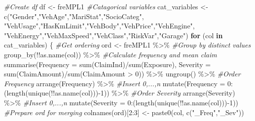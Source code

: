 \documentclass[
]{article}
\newenvironment{Shaded}{\begin{snugshade}}{\end{snugshade}}
\newcommand{\AttributeTok}[1]{\textcolor[rgb]{0.77,0.63,0.00}{#1}}
\newcommand{\CommentTok}[1]{\textcolor[rgb]{0.56,0.35,0.01}{\textit{#1}}}
\newcommand{\ControlFlowTok}[1]{\textcolor[rgb]{0.13,0.29,0.53}{\textbf{#1}}}
\newcommand{\DecValTok}[1]{\textcolor[rgb]{0.00,0.00,0.81}{#1}}
\newcommand{\FunctionTok}[1]{\textcolor[rgb]{0.00,0.00,0.00}{#1}}
\newcommand{\NormalTok}[1]{#1}
\newcommand{\OtherTok}[1]{\textcolor[rgb]{0.56,0.35,0.01}{#1}}
\newcommand{\SpecialCharTok}[1]{\textcolor[rgb]{0.00,0.00,0.00}{#1}}
\newcommand{\StringTok}[1]{\textcolor[rgb]{0.31,0.60,0.02}{#1}}
\begin{document}
\begin{Shaded}
\begin{Highlighting}[]
\CommentTok{\#Create df}
\NormalTok{df }\OtherTok{\textless{}{-}}\NormalTok{ freMPL1}
\CommentTok{\#Catagorical variables}
\NormalTok{cat\_variables }\OtherTok{\textless{}{-}} \FunctionTok{c}\NormalTok{(}\StringTok{"Gender"}\NormalTok{,}\StringTok{"VehAge"}\NormalTok{,}\StringTok{"MariStat"}\NormalTok{,}\StringTok{"SocioCateg"}\NormalTok{,}
                   \StringTok{"VehUsage"}\NormalTok{,}\StringTok{"HasKmLimit"}\NormalTok{,}\StringTok{"VehBody"}\NormalTok{,}\StringTok{"VehPrice"}\NormalTok{,}\StringTok{"VehEngine"}\NormalTok{,}
                   \StringTok{"VehEnergy"}\NormalTok{,}\StringTok{"VehMaxSpeed"}\NormalTok{,}\StringTok{"VehClass"}\NormalTok{,}\StringTok{"RiskVar"}\NormalTok{,}\StringTok{"Garage"}\NormalTok{)}
\ControlFlowTok{for}\NormalTok{ (col }\ControlFlowTok{in}\NormalTok{ cat\_variables) \{}
  \CommentTok{\#Get ordering}
\NormalTok{  ord }\OtherTok{\textless{}{-}}\NormalTok{ freMPL1 }\SpecialCharTok{\%\textgreater{}\%} 
    \CommentTok{\#Group by distinct values}
    \FunctionTok{group\_by}\NormalTok{(}\SpecialCharTok{!!}\FunctionTok{as.name}\NormalTok{(col)) }\SpecialCharTok{\%\textgreater{}\%}
    \CommentTok{\#Calculate frequency and mean claim}
    \FunctionTok{summarise}\NormalTok{(}\AttributeTok{Frequency =} \FunctionTok{sum}\NormalTok{(ClaimInd)}\SpecialCharTok{/}\FunctionTok{sum}\NormalTok{(Exposure),}
              \AttributeTok{Severity =} \FunctionTok{sum}\NormalTok{(ClaimAmount)}\SpecialCharTok{/}\FunctionTok{sum}\NormalTok{(ClaimAmount }\SpecialCharTok{\textgreater{}} \DecValTok{0}\NormalTok{)) }\SpecialCharTok{\%\textgreater{}\%}
    \FunctionTok{ungroup}\NormalTok{() }\SpecialCharTok{\%\textgreater{}\%}
    \CommentTok{\#Order Frequency}
    \FunctionTok{arrange}\NormalTok{(Frequency) }\SpecialCharTok{\%\textgreater{}\%}
    \CommentTok{\#Insert 0,...,n}
    \FunctionTok{mutate}\NormalTok{(}\AttributeTok{Frequency =} \DecValTok{0}\SpecialCharTok{:}\NormalTok{(}\FunctionTok{length}\NormalTok{(}\FunctionTok{unique}\NormalTok{(}\SpecialCharTok{!!}\FunctionTok{as.name}\NormalTok{(col)))}\SpecialCharTok{{-}}\DecValTok{1}\NormalTok{)) }\SpecialCharTok{\%\textgreater{}\%}
    \CommentTok{\#Order Severity}
    \FunctionTok{arrange}\NormalTok{(Severity) }\SpecialCharTok{\%\textgreater{}\%}
    \CommentTok{\#Insert 0,...,n}
    \FunctionTok{mutate}\NormalTok{(}\AttributeTok{Severity =} \DecValTok{0}\SpecialCharTok{:}\NormalTok{(}\FunctionTok{length}\NormalTok{(}\FunctionTok{unique}\NormalTok{(}\SpecialCharTok{!!}\FunctionTok{as.name}\NormalTok{(col)))}\SpecialCharTok{{-}}\DecValTok{1}\NormalTok{))}
  \CommentTok{\#Prepare ord for merging}
  \FunctionTok{colnames}\NormalTok{(ord)[}\DecValTok{2}\SpecialCharTok{:}\DecValTok{3}\NormalTok{] }\OtherTok{\textless{}{-}} \FunctionTok{paste0}\NormalTok{(col, }\FunctionTok{c}\NormalTok{(}\StringTok{"\_Freq"}\NormalTok{,}\StringTok{"\_Sev"}\NormalTok{))}
  

\end{Highlighting}
\end{Shaded}
\end{document}
